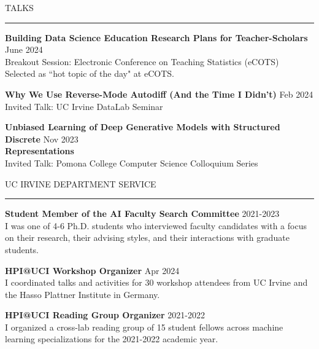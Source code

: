 \documentclass{resume} %
\renewenvironment{rSection}[1]{
\sectionskip
\textcolor{CarnegieMellonRed}{\MakeUppercase{#1}}
\sectionlineskip
\hrule
\begin{list}{}{
\setlength{\leftmargin}{1.5em}
}
\item[]
}{
\end{list}
}
\begin{document}
\begin{rSection}{Talks}	
{\bf Building Data Science Education Research Plans for Teacher-Scholars} \hfill { June 2024}\\
Breakout Session: Electronic Conference on Teaching Statistics (eCOTS)\\
Selected as ``hot topic of the day" at eCOTS. \vspace{1.em}


{\bf Why We Use Reverse-Mode Autodiff (And the Time I Didn't)} \hfill { Feb 2024}\\
Invited Talk: UC Irvine DataLab Seminar \vspace{1.em}

{\bf Unbiased Learning of Deep Generative Models with Structured Discrete } \hfill { Nov 2023}\\
{\bf  Representations}\\
Invited Talk: Pomona College Computer Science Colloquium Series\vspace{1.em}
\end{rSection}
\begin{rSection}{UC Irvine Department Service}	
{\bf Student Member of the AI Faculty Search Committee} \hfill { 2021-2023}\\
I was one of 4-6 Ph.D. students who interviewed faculty candidates with a focus on their research, their advising styles, and their interactions with graduate students.
  \vspace{1.em}

{\bf HPI@UCI Workshop Organizer} \hfill { Apr 2024}\\
I coordinated talks and activities for 30 workshop attendees from UC Irvine and the Hasso Plattner Institute in Germany. \vspace{1.em}

{\bf HPI@UCI Reading Group Organizer} \hfill { 2021-2022}\\
I organized a cross-lab reading group of 15 student fellows across machine learning specializations for the 2021-2022 academic year. \vspace{1.em}

\end{rSection}
\newpage
\end{document}
